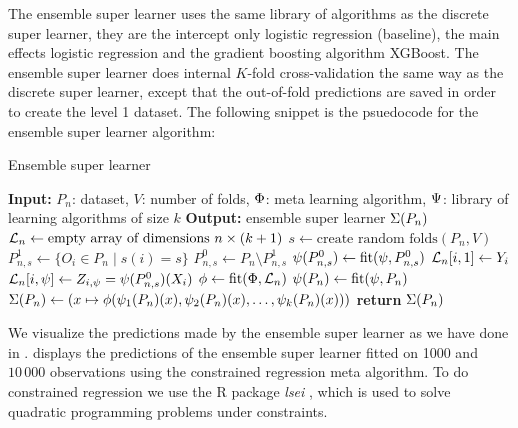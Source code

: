 \documentclass[./main.tex]{subfiles}
\begin{document}
The ensemble super learner uses the same library of algorithms as the discrete super learner, they are the intercept only logistic regression (baseline), the main effects logistic regression and the gradient boosting algorithm XGBoost. The ensemble super learner does internal $ K $-fold cross-validation the same way as the discrete super learner, except that the out-of-fold predictions are saved in order to create the level 1 dataset. The following snippet is the psuedocode for the ensemble super learner algorithm:
\begin{algorithm}[H]
\caption{Ensemble super learner}
\begin{algorithmic}[1]
\State \textbf{Input:} $P_n$: dataset, $V$: number of folds, $ \Phi $: meta learning algorithm, $ \Psi $: library of learning algorithms of size $ k $
\State \textbf{Output:} ensemble super learner $ \Sigma(P_n) $
\State $\mathcal{L}_n \gets \text{empty array of dimensions } n \times (k+1)$  
\State $s \gets \text{create random folds}(P_n, V)$ 
    \State $P_{n, s}^{1} \gets \{O_i \in P_n \mid s(i) = s\} $
    \State $P_{n, s}^{0} \gets P_n \setminus P_{n,s}^{1} $
    \For{$\la \in \lib$}
        \State $ \psi(P_{n,s}^{0}) \gets \text{fit}(\psi, P_{n, s}^{0})$
            \State $ \mathcal{L}_n[i, 1] \gets Y_i $ 
            \State $ \mathcal{L}_n[i, \psi] \gets Z_{i, \psi} = \psi(P_{n,s}^{0})(X_i) $ 
        \EndFor
    \EndFor
\EndFor
\State $ \phi \gets \text{fit}(\Phi, \mathcal{L}_n) $ 
\For{$\la \in \lib$}
    \State $ \psi(P_{n}) \gets \text{fit}(\psi, P_{n})$ 
\EndFor
\State $ \Sigma(P_n) \gets (x \mapsto \phi(\psi_1(P_n)(x), \psi_2(P_n)(x), \dots , \psi_{k}(P_n)(x))) $ 
\State \textbf{return} $ \Sigma(P_n) $
\end{algorithmic}
\end{algorithm}
We visualize the predictions made by the ensemble super learner as we have done in .  displays the predictions of the ensemble super learner fitted on 1000 and $ 10\,000 $ observations using the constrained regression meta algorithm. To do constrained regression we use the R package \textit{lsei} \parencite{lsei}, which is used to solve quadratic programming problems under constraints.  
\end{document}
